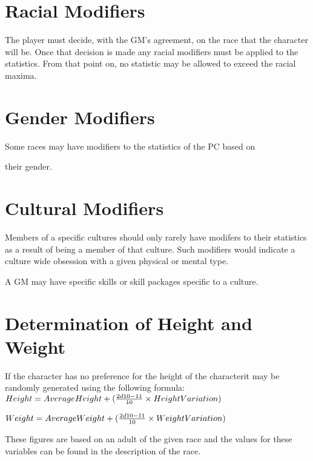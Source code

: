

\clearpage

\section{Racial Modifiers}

The player must decide, with the GM's agreement, on the race that the 
character will be. Once that decision is made any racial modifiers 
must be applied to the statistics. From that point on, no statistic 
may be allowed to exceed the racial maxima.

\section{Gender Modifiers}

Some races may have modifiers to the statistics of the PC based on 

 their gender.

\section{Cultural Modifiers}

Members of a specific cultures should only rarely have modifers 
to their statistics as a result of being a member of that culture.
Such modifiers would indicate a culture wide obsession with a given 
physical or mental type. 

A GM may have specific skills or skill packages specific to a culture.

\section{Determination of Height and Weight}

If the character has no preference for the height of the characterit 
may be randomly generated using the following formula: \\

\( Height = {Average Height} + ( {{2d10 - 11} \over {10}} \times 
{Height Variation} )
\)

\( Weight = {Average Weight} + ( {{2d10 - 11} \over {10}} \times 
{Weight Variation})
\)

These figures are based on an adult of the given race and the values
for these variables can be found in the description of the race.
 
